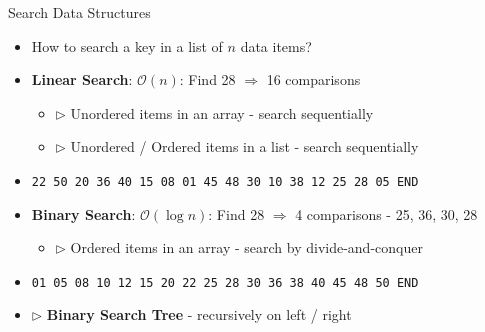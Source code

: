 \documentclass[aspectratio=169, xcolor=dvipsnames]{beamer}
\begin{document}
\begin{frame}{Search Data Structures}
    \begin{itemize}[<+->]
        \item How to search a key in a list of $n$ data items?
        \item \textbf{Linear Search}: $\mathcal{O}(n)$: Find 28 $\Rightarrow$ 16 comparisons
        \begin{itemize}[<+->]
            \item $\triangleright$ Unordered items in an array - search sequentially
            \item $\triangleright$ Unordered / Ordered items in a list - search sequentially
        \end{itemize}
        \item \texttt{22 50 20 36 40 15 08 01 45 48 30 10 38 12 25 28 05 END}
        \item \textbf{Binary Search}: $\mathcal{O}(\log n)$: Find 28 $\Rightarrow$ 4 comparisons - 25, 36, 30, 28
        \begin{itemize}[<+->]
            \item $\triangleright$ Ordered items in an array - search by divide-and-conquer
        \end{itemize}
        \item \texttt{01 05 08 10 12 15 20 22 25 28 30 36 38 40 45 48 50 END}
        \item $\triangleright$ \textbf{Binary Search Tree} - recursively on left / right
    \end{itemize}
\end{frame}
\end{document}
